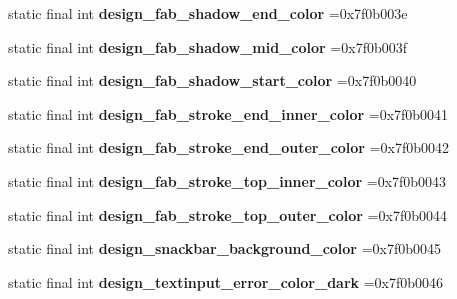 \begin{DoxyCompactItemize}
static final int {\bfseries design\+\_\+fab\+\_\+shadow\+\_\+end\+\_\+color} =0x7f0b003e
\item 
\mbox{\label{classproject4_1_1xaria_1_1R_1_1color_a636138ef698a11cee4df9ec13139f057}} 
static final int {\bfseries design\+\_\+fab\+\_\+shadow\+\_\+mid\+\_\+color} =0x7f0b003f
\item 
\mbox{\label{classproject4_1_1xaria_1_1R_1_1color_a1d1589ce0bb16328c9d0022542f762b6}} 
static final int {\bfseries design\+\_\+fab\+\_\+shadow\+\_\+start\+\_\+color} =0x7f0b0040
\item 
\mbox{\label{classproject4_1_1xaria_1_1R_1_1color_aac10906df56cc1c0d7f175f0ef4e4952}} 
static final int {\bfseries design\+\_\+fab\+\_\+stroke\+\_\+end\+\_\+inner\+\_\+color} =0x7f0b0041
\item 
\mbox{\label{classproject4_1_1xaria_1_1R_1_1color_a42bae3cd60e737fcbca46e1d556eddba}} 
static final int {\bfseries design\+\_\+fab\+\_\+stroke\+\_\+end\+\_\+outer\+\_\+color} =0x7f0b0042
\item 
\mbox{\label{classproject4_1_1xaria_1_1R_1_1color_aa5888271d6c8b127cce7ccea11bb8444}} 
static final int {\bfseries design\+\_\+fab\+\_\+stroke\+\_\+top\+\_\+inner\+\_\+color} =0x7f0b0043
\item 
\mbox{\label{classproject4_1_1xaria_1_1R_1_1color_a36c3eb8733f29d67972ef0b48837d42b}} 
static final int {\bfseries design\+\_\+fab\+\_\+stroke\+\_\+top\+\_\+outer\+\_\+color} =0x7f0b0044
\item 
\mbox{\label{classproject4_1_1xaria_1_1R_1_1color_acb3b9ff6f16c067047035a6945c607a7}} 
static final int {\bfseries design\+\_\+snackbar\+\_\+background\+\_\+color} =0x7f0b0045
\item 
\mbox{\label{classproject4_1_1xaria_1_1R_1_1color_aa15c58fb2738fd5ea1047a8c8ce7cb80}} 
static final int {\bfseries design\+\_\+textinput\+\_\+error\+\_\+color\+\_\+dark} =0x7f0b0046
\item 

\end{DoxyCompactItemize}
